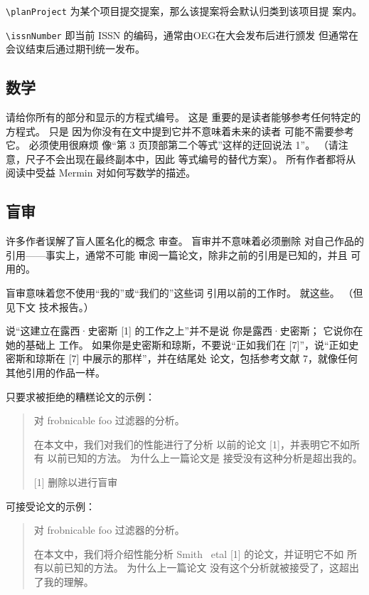 \documentclass[10pt,letterpaper,a4paper]{article}
\def\planProject{45646} %
\def\issnNumber{2070-1721} %
\begin{document}
\begin{sloppypar}
\verb'\planProject' 为某个项目提交提案，那么该提案将会默认归类到该项目提
案内。

\verb'\issnNumber' 即当前 ISSN 的编码，通常由OEG在大会发布后进行颁发
但通常在会议结束后通过期刊统一发布。

\subsection{数学}
请给你所有的部分和显示的方程式编号。 这是
重要的是读者能够参考任何特定的方程式。 只是
因为你没有在文中提到它并不意味着未来的读者
可能不需要参考它。 必须使用很麻烦
像“第 3 页顶部第二个等式”这样的迂回说法
1''。 （请注意，尺子不会出现在最终副本中，因此
等式编号的替代方案）。 所有作者都将从阅读中受益
Mermin 对如何写数学的描述。

\subsection{盲审}
许多作者误解了盲人匿名化的概念
审查。 盲审并不意味着必须删除
对自己作品的引用——事实上，通常不可能
审阅一篇论文，除非之前的引用是已知的，并且
可用的。

盲审意味着您不使用“我的”或“我们的”这些词
引用以前的工作时。 就这些。 （但见下文
技术报告。）

说“这建立在露西·史密斯 [1] 的工作之上”并不是说
你是露西·史密斯； 它说你在她的基础上
工作。 如果你是史密斯和琼斯，不要说“正如我们在
[7]''，说“正如史密斯和琼斯在 [7] 中展示的那样”，并在结尾处
论文，包括参考文献 7，就像任何其他引用的作品一样。

只要求被拒绝的糟糕论文的示例：
\begin{quote}
\begin{center}
   对 frobnicable foo 过滤器的分析。
\end{center}

在本文中，我们对我们的性能进行了分析
    以前的论文 [1]，并表明它不如所有
    以前已知的方法。 为什么上一篇论文是
    接受没有这种分析是超出我的。

    [1] 删除以进行盲审
\end{quote}


可接受论文的示例：

\begin{quote}
\begin{center}
   对 frobnicable foo 过滤器的分析。
\end{center}

在本文中，我们将介绍性能分析
    Smith \ etal [1] 的论文，并证明它不如
    所有以前已知的方法。 为什么上一篇论文
    没有这个分析就被接受了，这超出了我的理解。


\end{quote}
\end{sloppypar}
\end{document}
